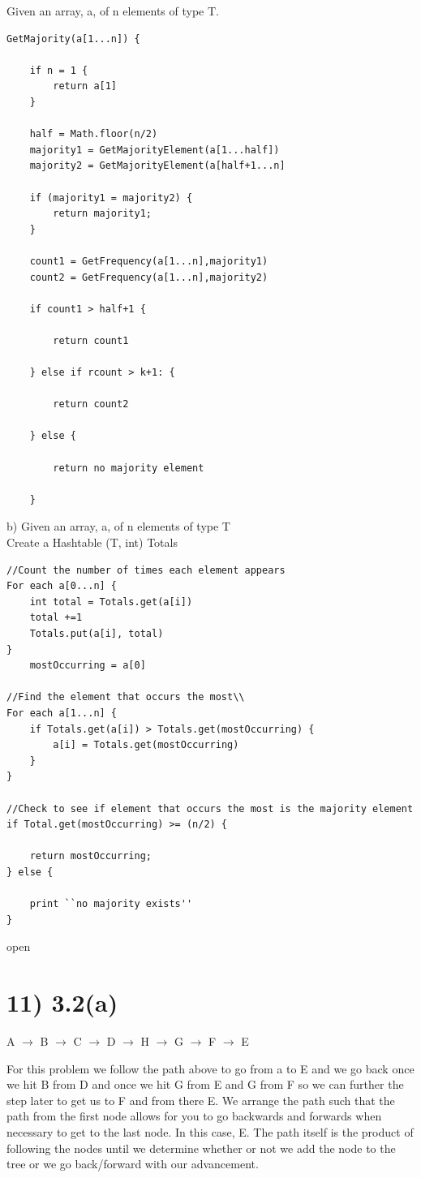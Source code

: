 \documentclass[a4paper]{article}
\begin{document}
Given an array, a, of n elements of type T.
\begin{verbatim}
GetMajority(a[1...n]) {
	
	if n = 1 {
		return a[1]
	}

	half = Math.floor(n/2)
	majority1 = GetMajorityElement(a[1...half])
	majority2 = GetMajorityElement(a[half+1...n]

	if (majority1 = majority2) {
		return majority1;
	}

	count1 = GetFrequency(a[1...n],majority1)
	count2 = GetFrequency(a[1...n],majority2)

	if count1 > half+1 {

		return count1

	} else if rcount > k+1: {
		
		return count2

	} else {

		return no majority element

	}
\end{verbatim}


b) 
Given an array, a, of n elements of type T\\
Create a Hashtable (T, int) Totals
\begin{verbatim}
//Count the number of times each element appears
For each a[0...n] {
	int total = Totals.get(a[i])
	total +=1
	Totals.put(a[i], total)
}
	mostOccurring = a[0]

//Find the element that occurs the most\\
For each a[1...n] {
	if Totals.get(a[i]) > Totals.get(mostOccurring) {
		a[i] = Totals.get(mostOccurring)
	}
}

//Check to see if element that occurs the most is the majority element
if Total.get(mostOccurring) >= (n/2) {
	
	return mostOccurring;
} else {
	
	print ``no majority exists''
}
\end{verbatim}
open 

\section*{11) 3.2(a)}
A $\rightarrow$ B $\rightarrow$ C $\rightarrow$ D $\rightarrow$ H $\rightarrow$ G $\rightarrow$ F $\rightarrow$ E

For this problem we follow the path above to go from a to E and we go back once we hit B from D and once we hit G from E and G from F so we can further the step later to get us to F and from there E. We arrange the path such that the path from the first node allows for you to go backwards and forwards when necessary to get to the last node. In this case, E. The path itself is the product of following the nodes until we determine whether or not we add the node to the tree or we go back/forward with our advancement. 
\end{document}
